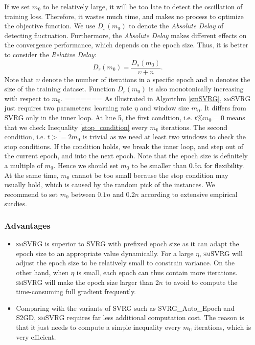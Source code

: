 \documentclass[conference]{IEEEtran}
\begin{document}
\begin{algorithm}[t]
 If we set $m_0$ to be relatively large, it will be too late to detect the oscillation of training loss. Therefore, it wastes much time, and makes no process to optimize the objective function. We use $D_s(m_0)$ to denote the \emph{Absolute Delay} of detecting fluctuation. Furthermore, the \emph{Absolute Delay} makes different effects on the convergence performance, which  depends on the epoch size. Thus, it is better to consider the \emph{Relative Delay}:
 \begin{equation}
 \label{relative_delay}
 D_r(m_0)=\frac{D_s(m_0)}{\upsilon+n}.
 \end{equation}
 Note that $\upsilon$ denote the number of iterations in a specific epoch and $n$ denotes the size of the training dataset. Function $D_r(m_0)$ is also monotonically increasing with respect to $m_0$.
=======
As illustrated in Algorithm \ref{smSVRG}, \textsc{smSVRG} just requires two parameters: learning rate $\eta$ and window size $m_0$. It differs from SVRG only in the inner loop. At line 5, the first condition, i.e. $t\%m_0=0$ means that  we check Inequality \ref{stop_condition} every $m_0$ iterations. The second condition, i.e. $t>=2m_0$ is trivial as we need at least two windows to check the stop conditions.  If the condition holds, we break the inner loop, and step out of the current epoch, and into the next epoch. Note that the epoch size is definitely a multiple of $m_0$. Hence we should set $m_0$ to be smaller than $0.5n$ for flexibility. At the same time, $m_0$ cannot be too small because the stop condition may usually hold, which is caused by the random pick of the instances. We recommend to set $m_0$ between $0.1n$ and $0.2n$ according to extensive empirical sutdies.

\subsubsection{Advantages}
\begin{itemize}
\item \textsc{smSVRG} is superior to SVRG with prefixed epoch size as it can adapt the epoch size to an appropriate value dynamically. For a large $\eta$, \textsc{smSVRG} will adjust the epoch size to be relatively small to constrain variance. On the other hand, when $\eta$ is small, each epoch can thus contain more iterations. \textsc{smSVRG} will make the epoch size larger than $2n$ to avoid to compute the time-consuming full gradient frequently.
\item Comparing with the variants of SVRG such as SVRG\_Auto\_Epoch and S2GD, \textsc{smSVRG} requires far less additional computation cost. The reason is that it just needs to compute a simple inequality every $m_0$ iterations, which is very efficient.
\end{itemize}
 

\end{algorithm}
\end{document}
